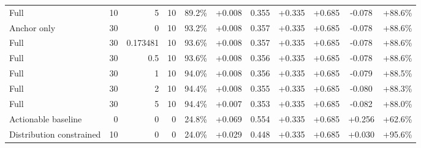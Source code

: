 \begin{table}[htbp]
\begin{tabular}{lrrrccccccc}
Full & 10 & 5 & 10 & 89.2\% & +0.008 & 0.355 & +0.335 & +0.685 & -0.078 & +88.6\% \\
Anchor only & 30 & 0 & 10 & 93.2\% & +0.008 & 0.357 & +0.335 & +0.685 & -0.078 & +88.6\% \\
Full & 30 & 0.173481 & 10 & 93.6\% & +0.008 & 0.357 & +0.335 & +0.685 & -0.078 & +88.6\% \\
Full & 30 & 0.5 & 10 & 93.6\% & +0.008 & 0.356 & +0.335 & +0.685 & -0.078 & +88.6\% \\
Full & 30 & 1 & 10 & 94.0\% & +0.008 & 0.356 & +0.335 & +0.685 & -0.079 & +88.5\% \\
Full & 30 & 2 & 10 & 94.4\% & +0.008 & 0.355 & +0.335 & +0.685 & -0.080 & +88.3\% \\
Full & 30 & 5 & 10 & 94.4\% & +0.007 & 0.353 & +0.335 & +0.685 & -0.082 & +88.0\% \\
Actionable baseline & 0 & 0 & 0 & 24.8\% & +0.069 & 0.554 & +0.335 & +0.685 & +0.256 & +62.6\% \\
Distribution constrained & 10 & 0 & 0 & 24.0\% & +0.029 & 0.448 & +0.335 & +0.685 & +0.030 & +95.6\% \\
\bottomrule
\end{tabular}
\end{table}